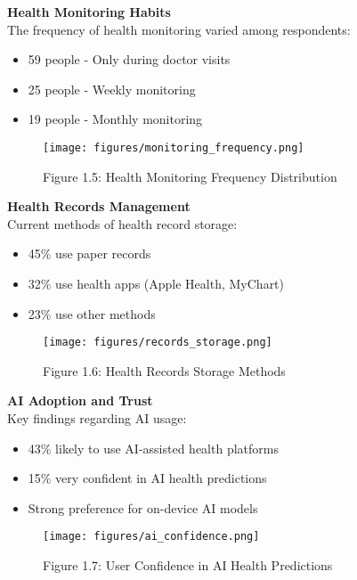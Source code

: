 \begin{minipage}{0.5\textwidth}
\textbf{Health Monitoring Habits}\\
The frequency of health monitoring varied among respondents:
\begin{itemize}
    \item 59 people - Only during doctor visits
    \item 25 people - Weekly monitoring
    \item 19 people - Monthly monitoring
\end{itemize}
\end{minipage}
\begin{minipage}{0.5\textwidth}
\begin{figure}[H]
    \centering
    \texttt{[image: figures/monitoring\_frequency.png]}
    \caption{Figure 1.5: Health Monitoring Frequency Distribution}
\end{figure}
\end{minipage}

\begin{minipage}{0.5\textwidth}
\textbf{Health Records Management}\\
Current methods of health record storage:
\begin{itemize}
    \item 45\% use paper records
    \item 32\% use health apps (Apple Health, MyChart)
    \item 23\% use other methods
\end{itemize}
\end{minipage}
\begin{minipage}{0.5\textwidth}
\begin{figure}[H]
    \centering
    \texttt{[image: figures/records\_storage.png]}
    \caption{Figure 1.6: Health Records Storage Methods}
\end{figure}
\end{minipage}

\begin{minipage}{0.5\textwidth}
\textbf{AI Adoption and Trust}\\
Key findings regarding AI usage:
\begin{itemize}
    \item 43\% likely to use AI-assisted health platforms
    \item 15\% very confident in AI health predictions
    \item Strong preference for on-device AI models
\end{itemize}
\end{minipage}
\begin{minipage}{0.5\textwidth}
\begin{figure}[H]
    \centering
    \texttt{[image: figures/ai\_confidence.png]}
    \caption{Figure 1.7: User Confidence in AI Health Predictions}
\end{figure}
\end{minipage}

